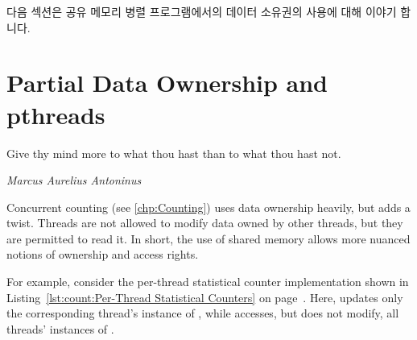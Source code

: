 다음 섹션은 공유 메모리 병렬 프로그램에서의 데이터 소유권의 사용에 대해 이야기
합니다.

\iffalse

This same pattern can be written in C as well as in \co{sh}, as illustrated by
Listings~\ref{lst:toolsoftrade:Using the fork() Primitive}
and~\ref{lst:toolsoftrade:Using the wait() Primitive}.

It bears repeating that these trivial forms of parallelism are not in
any way cheating or ducking responsibility, but are rather simple and
elegant ways to make your code run faster.
It is fast, scales well, is easy to program, easy to maintain, and
gets the job done.
In addition, taking this approach (where applicable) allows the developer
more time to focus on other things whether these things might involve
applying sophisticated single-threaded optimizations to \co{compute_it}
on the one hand, or applying sophisticated parallel-programming patterns
to portions of the code where this approach is inapplicable.
What is not to like?

The next section discusses the use of data ownership in shared-memory
parallel programs.

\fi

\section{Partial Data Ownership and pthreads}
\label{sec:owned:Partial Data Ownership and pthreads}
%
\epigraph{Give thy mind more to what thou hast than to what thou hast not.}
	 {\emph{Marcus Aurelius Antoninus}}

Concurrent counting (see \cref{chp:Counting}) uses data ownership heavily,
but adds a twist.
Threads are not allowed to modify data owned by other threads,
but they are permitted to read it.
In short, the use of shared memory allows more nuanced notions
of ownership and access rights.

For example, consider the per-thread statistical counter implementation
shown in
Listing~\ref{lst:count:Per-Thread Statistical Counters} on
page~\pageref{lst:count:Per-Thread Statistical Counters}.
Here,  updates only the corresponding thread's
instance of ,
while  accesses, but does not modify, all
threads' instances of .

\QuickQuizEnd

